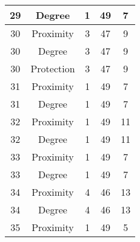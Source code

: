 \documentclass[results.tex]{subfiles}
\begin{document}
\begin{center}
\begin{tabular}{| c || c | c | c | c |}
            \hline
            29                      & Degree                       & 1                      & 49                      & 7                    \\
            \hline
            30                      & Proximity                    & 3                      & 47                      & 9                    \\
            \hline
            30                      & Degree                       & 3                      & 47                      & 9                    \\
            \hline
            30                      & Protection                   & 3                      & 47                      & 9                    \\
            \hline
            31                      & Proximity                    & 1                      & 49                      & 7                    \\
            \hline
            31                      & Degree                       & 1                      & 49                      & 7                    \\
            \hline
            32                      & Proximity                    & 1                      & 49                      & 11                   \\
            \hline
            32                      & Degree                       & 1                      & 49                      & 11                   \\
            \hline
            33                      & Proximity                    & 1                      & 49                      & 7                    \\
            \hline
            33                      & Degree                       & 1                      & 49                      & 7                    \\
            \hline
            34                      & Proximity                    & 4                      & 46                      & 13                   \\
            \hline
            34                      & Degree                       & 4                      & 46                      & 13                   \\
            \hline
            35                      & Proximity                    & 1                      & 49                      & 5                    \\

\end{tabular}
\end{center}
\end{document}
